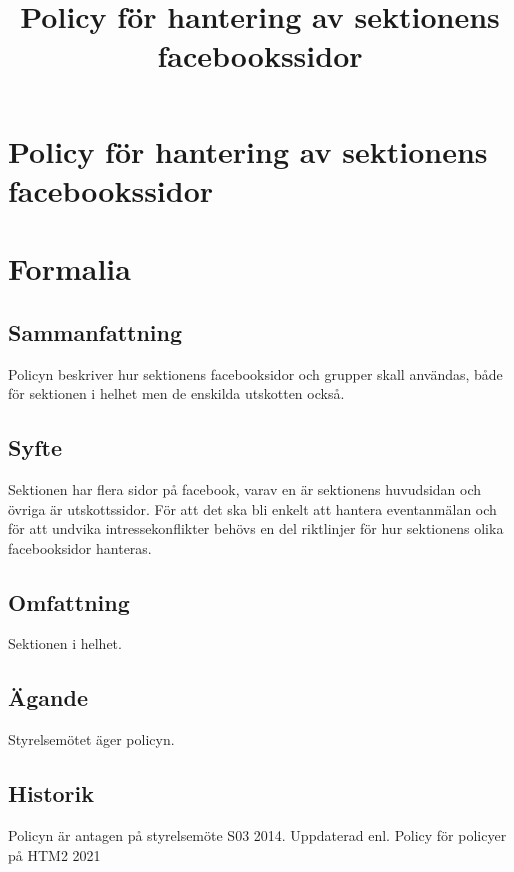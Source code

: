 \documentclass{dsekprotokoll}
\title{Policy för hantering av sektionens facebookssidor}
\author{}
\begin{document}
\section*{Policy för hantering av sektionens facebookssidor}
\section{Formalia}
\subsection{Sammanfattning}
Policyn beskriver hur sektionens facebooksidor och grupper skall användas, både för sektionen i helhet men de enskilda utskotten också.
\subsection{Syfte}
Sektionen har flera sidor på facebook, varav en är sektionens huvudsidan och övriga är utskottssidor. För att det ska bli enkelt att hantera eventanmälan och för att undvika intressekonflikter behövs en del riktlinjer för hur sektionens olika facebooksidor hanteras.
\subsection{Omfattning}
Sektionen i helhet.
\subsection{Ägande}
Styrelsemötet äger policyn.
\subsection{Historik}
Policyn är antagen på styrelsemöte S03 2014.
Uppdaterad enl. Policy för policyer på HTM2 2021
\end{document}
